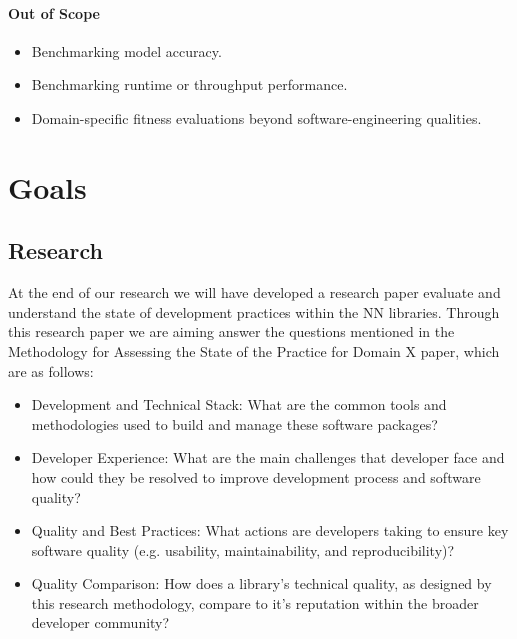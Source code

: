 \documentclass{article}
\begin{document}
\begin{itemize}
\begin{itemize}
\paragraph{Out of Scope}
\begin{itemize}
  \item Benchmarking model accuracy.
  \item Benchmarking runtime or throughput performance.
  \item Domain-specific fitness evaluations beyond software-engineering qualities.
\end{itemize}


\section{Goals}
\subsection{Research}
At the end of our research we will have developed a research paper evaluate and understand the state of development practices within the NN libraries. Through this research paper we are aiming answer the questions mentioned in the Methodology for Assessing the State of the Practice for Domain X paper, which are as follows:
\begin{itemize}
    \item Development and Technical Stack: What are the common tools and methodologies used to build and manage these software packages?
    \item Developer Experience: What are the main challenges that developer face and how could they be resolved to improve development process and software quality?
    \item Quality and Best Practices: What actions are developers taking to ensure key software quality (e.g. usability, maintainability, and reproducibility)?
    \item Quality Comparison: How does a library's technical quality, as designed by this research methodology, compare to it's reputation within the broader developer community?
\end{itemize}

\end{itemize}
\end{itemize}
\end{document}
